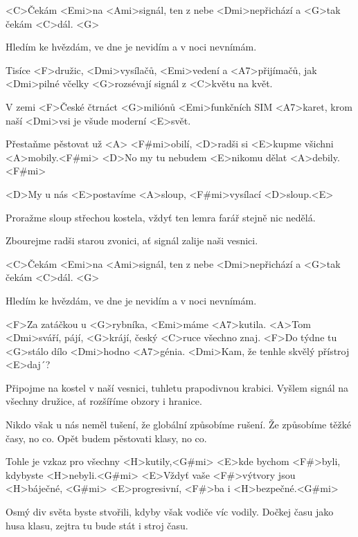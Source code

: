

\zs

<C>Čekám <Emi>na <Ami>signál, 
ten z nebe <Dmi>nepřichází 
a <G>tak čekám <C>dál. <G> 

Hledím ke hvězdám, 
ve dne je nevidím 
a v noci nevnímám. 

Tisíce <F>družic, <Dmi>vysílačů, <Emi>vedení a <A7>přijímačů, 
jak <Dmi>pilné včelky <G>rozsévají signál z <C>květu na květ. 

V zemi <F>České čtrnáct <G>miliónů <Emi>funkčních SIM <A7>karet, 
krom naší <Dmi>vsi je všude moderní <E>svět. 

Přestaňme pěstovat už <A> <F#mi>obilí, <D>radši si <E>kupme všichni <A>mobily.<F#mi> 
<D>No my tu nebudem <E>nikomu dělat <A>debily.<F#mi>

<D>My u nás <E>postavíme <A>sloup, 
<F#mi>vysílací <D>sloup.<E> 

Proražme sloup střechou kostela, 
vždyť ten lemra farář stejně nic nedělá. 

Zbourejme radši starou zvonici, 
ať signál zalije naši vesnici. 

<C>Čekám <Emi>na <Ami>signál, 
ten z nebe <Dmi>nepřichází 
a <G>tak čekám <C>dál. <G> 

Hledím ke hvězdám, 
ve dne je nevidím 
a v noci nevnímám. 

<F>Za zatáčkou u <G>rybníka, <Emi>máme <A7>kutila. 
<A>Tom <Dmi>sváří, pájí, <G>krájí, český <C>ruce všechno znaj. 
<F>Do týdne tu <G>stálo dílo <Dmi>hodno <A7>génia. 
<Dmi>Kam, že tenhle skvělý přístroj <E>daj´? 

Připojme na kostel v naší vesnici, 
tuhletu prapodivnou krabici. 
Vyšlem signál na všechny družice, 
ať rozšíříme obzory i hranice. 

Nikdo však u nás neměl tušení, 
že globální způsobíme rušení. 
Že způsobíme těžké časy, no co. 
Opět budem pěstovati klasy, no co. 

Tohle je vzkaz pro všechny <H>kutily,<G#mi>
<E>kde bychom <F#>byli, kdybyste <H>nebyli.<G#mi> 
<E>Vždyť vaše <F#>výtvory jsou <H>báječné, <G#mi>
<E>progresivní, <F#>ba i <H>bezpečné.<G#mi>

Osmý div světa byste stvořili, 
kdyby však vodiče víc vodily. 
Dočkej času jako husa klasu, 
zejtra tu bude stát i stroj času.
\ks
\kp

